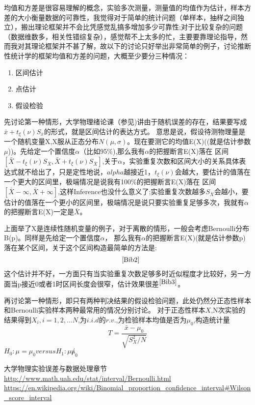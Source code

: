 \documentclass[12pt,twocolumn]{article}
\begin{document}
\large
\twocolumn
\setlength{\columnseprule}{1pt}
均值和方差是很容易理解的概念，实验多次测量，测量值的均值作为估计，样本方差的大小衡量数据的可靠性，我觉得对于简单的统计问题（单样本，抽样之间独立），搬出理论框架并不会比凭感觉乱搞多增加多少可靠性;对于比较复杂的问题（数据维数多，相关性错综复杂），感觉帮不上太多的忙，主要要靠理论指导，然而我对其理论框架并不甚了解，故以下的讨论只好举出非常简单的例子，讨论推断性统计学的框架均值和方差的问题，大概至少要分三种情况：

\begin{enumerate}
\item 区间估计
\item 点估计
\item 假设检验
\end{enumerate}

先讨论第一种情形，大学物理绪论课（参见\cite{Bib1})讲由于随机误差的存在，结果要写成$\bar{x}+t_{\xi}(\nu)S_{\bar{x}}$的形式，就是区间估计的表达方式。
意思是说，假设待测物理量是一个随机变量X,X服从正态分布$N(\mu,\sigma)$。现在要测它的均值E(X)((就是估计参数$\mu$))。先给定一个置信度$\alpha$（比如95\%),那么我有$\alpha$的把握断言E(X)落在
区间$[\bar{X}-t_{\xi}(\nu)S_{\bar{X}},\bar{X}+t_{\xi}(\nu)S_{\bar{X}}]$,关于$\alpha$，实验重复次数和区间大小的关系具体表达式就不给出了，只是定性地说，$alpha$越接近1，$t_{\xi}(\nu)$会越大，要估计的值落在一个更大的区间里，极端情况是说我有100\%的把握断言E(X)落在
区间$[\bar{X}-\infty,\bar{X}+\infty]$,这样Inference也没什么意义了;实验重复次数越多$S_{\bar{X}}$会越小，要估计的值落在一个更小的区间里，极端情况是说只要实验重复足够多次，我就有$\alpha$的把握断言E(X)一定是$\bar{X}$。

上面举了X是连续性随机变量的例子，对于离散的情形，一般会考虑Bernoulli分布B(p)。同样是先给定一个置信度$\alpha$，
那么我有$\alpha$的把握断言E(X)(就是估计参数p)落在某个区间，关于这个区间构造最简单的方法是:
\begin{equation*}
[\bar{x}-z\sqrt{\frac{\bar{x}(1-\bar{x})}{n}},\bar{x}+z\sqrt{\frac{\bar{x}(1-\bar{x})}{n}}] \quad^{\cite{Bib2}}
\end{equation*}
这个估计并不好，一方面只有当实验重复次数足够多时近似程度才比较好，另一方面当p接近0或者1时区间长度会很窄，估计效果很差$^{\cite{Bib3}}$。
\onecolumn

再讨论第一种情形，即只有两种判决结果的假设检验问题，此处仍然分正态性样本和Bernoulli实验样本两种最常用的情况分别讨论。
对于正态性样本$X$,N次实验的结果得到$X_i,i=1,2,...N$,为$i.i.d$的$r.v.$,为检验样本均值是否为$\mu_0$,构造统计量
\begin{equation}
T=\frac{\bar{x}-\mu_0}{\sqrt{S^2_X/N}}
\end{equation}
$H_0:\mu=\mu_0 versus H_1:\mu \not \mu_0$

\begin{thebibliography}{}
大学物理实验误差与数据处理章节
 \url{http://www.math.uah.edu/stat/interval/Bernoulli.html}
 \url{https://en.wikipedia.org/wiki/Binomial_proportion_confidence_interval#Wilson_score_interval}
\end{thebibliography}
\end{document}
